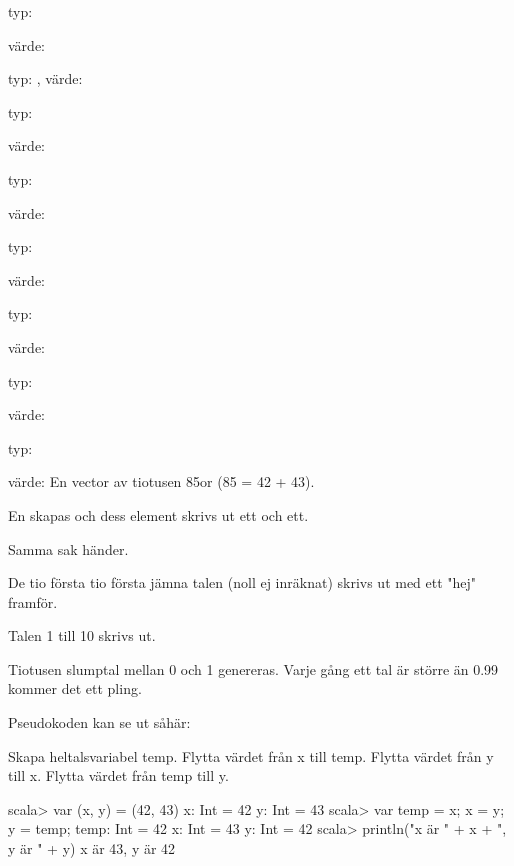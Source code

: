 \Subtask typ: 

värde: 

\Subtask typ: , värde: 

\Subtask typ: 

värde: 

\Task 

\Subtask typ: 

värde: 

\Subtask typ: 

värde: 

\Subtask typ: 

värde: 

\Subtask typ: 

värde: 

\Subtask typ: 

värde: En vector av tiotusen 85or (85 = 42 + 43).

\Task 

\Subtask En  skapas och dess element skrivs ut ett och ett.

\Subtask Samma sak händer.

\Subtask De tio första tio första jämna talen (noll ej inräknat) skrivs ut med ett "hej" framför.

\Subtask Talen 1 till 10 skrivs ut.

\Subtask Tiotusen slumptal mellan 0 och 1 genereras. Varje gång ett tal är större än 0.99 kommer det ett pling.

\Task 

\Subtask Pseudokoden kan se ut såhär:

Skapa heltalsvariabel temp. 
Flytta värdet från x till temp. 
Flytta värdet från y till x. 
Flytta värdet från temp till y.

\Subtask
\begin{REPLnonum}
scala> var (x, y) = (42, 43)
x: Int = 42
y: Int = 43
scala> var temp = x; x = y; y = temp;
temp: Int = 42
x: Int = 43
y: Int = 42
scala> println("x är " + x + ", y är " + y)
x är 43, y är 42
\end{REPLnonum}

